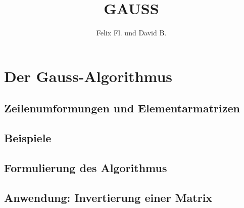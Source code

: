 \documentclass{scrartcl}
\title{GAUSS}
\author{Felix Fl. und David B.}
\begin{document}
\maketitle

\tableofcontents
\newpage

\section{Der Gauss-Algorithmus}
\subsection{Zeilenumformungen und Elementarmatrizen}


\subsection{Beispiele}


\subsection{Formulierung des Algorithmus}
\subsection{Anwendung: Invertierung einer Matrix}

\end{document}
